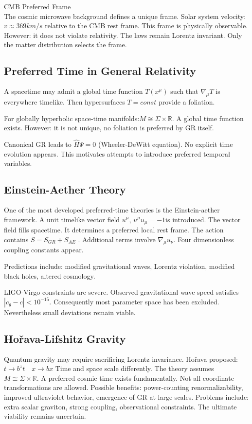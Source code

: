 CMB Preferred Frame\\
The cosmic microwave background defines a unique frame.
Solar system velocity:$ v \approx 369 km/s $
relative to the CMB rest frame.
This frame is physically observable.
However:
it does not violate relativity.
The laws remain Lorentz invariant.
Only the matter distribution selects the frame.

\subsection{Preferred Time in General Relativity}
A spacetime may admit a global time function $ T(x^\mu) $
such that $ \nabla_ \mu T $ is everywhere timelike.
Then hypersurfaces $ T=const $ provide a foliation.

For globally hyperbolic space-time manifolds:$ M\cong \Sigma \times \mathbb{R}.$ A global time function exists.
However:
it is not unique,
no foliation is preferred by GR itself.

Canonical GR leads to $ \hat H \Psi=0 $ (Wheeler-DeWitt equation).
No explicit time evolution appears.
This motivates attempts to introduce preferred temporal variables.

\subsection{Einstein-Aether Theory}
One of the most developed preferred-time theories is
the Einstein-aether framework.
A unit timelike vector field $ u^\mu $,
 $ u^\mu u_\mu=-1 $is introduced.
The vector field fills spacetime.
It determines a preferred local rest frame.
The action contains $ S=S_{GR}+S_{AE} $ .
Additional terms involve $ \nabla_\mu u_\nu. $
Four dimensionless coupling constants appear.

Predictions include:
modified gravitational waves,
Lorentz violation,
modified black holes,
altered cosmology.

LIGO-Virgo constraints are severe.
Observed gravitational wave speed satisfies $ |c_g -c|< 10^{-15}.$
Consequently most parameter space has been excluded.
Nevertheless small deviations remain viable.

\subsection{Hořava-Lifshitz Gravity}
Quantum gravity may require sacrificing Lorentz invariance.
Hořava proposed:$ t \rightarrow b^z t \quad x \rightarrow b x $
Time and space scale differently.
The theory assumes $ M\cong \Sigma \times \mathbb{R}.$
A preferred cosmic time exists fundamentally.
Not all coordinate transformations are allowed.
Possible benefits:
power-counting renormalizability,
improved ultraviolet behavior,
emergence of GR at large scales.
Problems include:
extra scalar graviton,
strong coupling,
observational constraints.
The ultimate viability remains uncertain.

